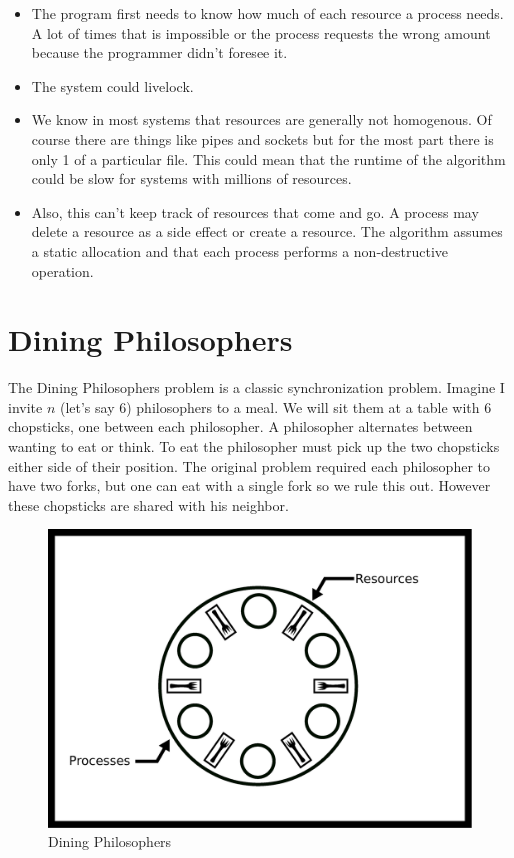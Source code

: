 \begin{itemize}
\item The program first needs to know how much of each resource a process needs. A lot of times that is impossible or the process requests the wrong amount because the programmer didn't foresee it.
\item The system could livelock.
\item We know in most systems that resources are generally not homogenous. Of course there are things like pipes and sockets but for the most part there is only 1 of a particular file. This could mean that the runtime of the algorithm could be slow for systems with millions of resources.
\item Also, this can't keep track of resources that come and go. A process may delete a resource as a side effect or create a resource. The algorithm assumes a static allocation and that each process performs a non-destructive operation.
\end{itemize}

\section{Dining Philosophers}

The Dining Philosophers problem is a classic synchronization problem.
Imagine I invite $n$ (let's say 6) philosophers to a meal.
We will sit them at a table with 6 chopsticks, one between each philosopher.
A philosopher alternates between wanting to eat or think.
To eat the philosopher must pick up the two chopsticks either side of their position.
The original problem required each philosopher to have two forks, but one can eat with a single fork so we rule this out.
However these chopsticks are shared with his neighbor.

\begin{figure}[H]
\centering
\includegraphics[width=.5\textwidth]{deadlock/drawings/dining.eps}
\caption{Dining Philosophers}
\end{figure}


